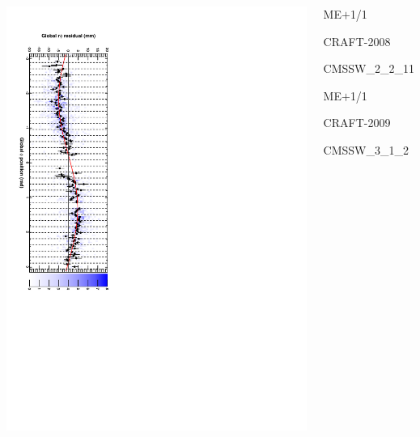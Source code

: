 \documentclass[compress]{beamer}
\begin{document}
\begin{frame}
\begin{columns}
\includegraphics[height=\linewidth, angle=90]{demonstrate_2009.pdf}
\begin{center}
ME$+$1/1

CRAFT-2008

CMSSW\_2\_2\_11

\vspace{1.5 cm}
ME$+$1/1

CRAFT-2009

CMSSW\_3\_1\_2

\vspace{0.5 cm}
\mbox{ }
\end{center}
\end{columns}
\end{frame}
\end{document}
